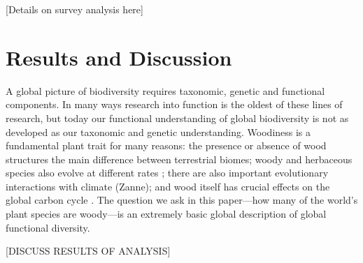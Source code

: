 \documentclass[12pt]{article}
\begin{document}
[Details on survey analysis here]


\section{Results and Discussion}

A global picture of biodiversity requires taxonomic, genetic and functional components.  In many ways research into function is the oldest of these lines of research, but today our functional understanding of global biodiversity is not as developed as our taxonomic and genetic understanding. Woodiness is a fundamental plant trait for many reasons: the presence or absence of wood  structures the main difference between terrestrial biomes; woody and herbaceous species also evolve at different rates \citep{SmithDonoghue};  there are also important evolutionary interactions with climate (Zanne); and wood itself has crucial effects on the global carbon cycle \citep{Cornwellwood}.  The question we ask in this paper---how many of the world's plant species are woody---is an extremely basic global description of global functional diversity.

[DISCUSS RESULTS OF ANALYSIS]
\end{document}
